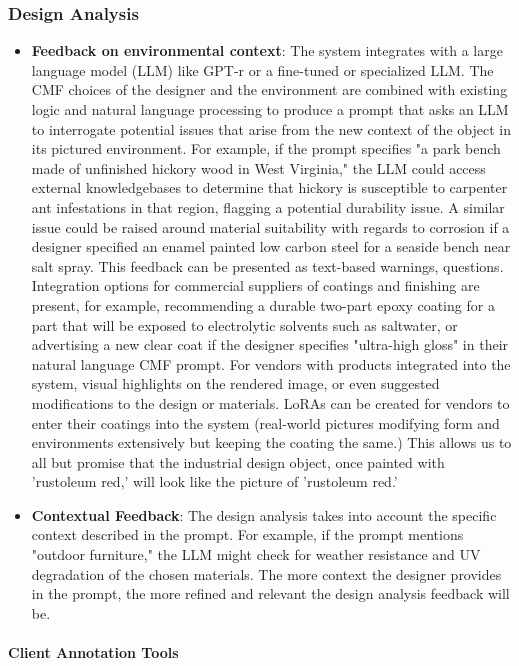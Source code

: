 \documentclass[12pt]{article}
\begin{document}
\subsubsection{Design Analysis}
\begin{itemize}
\item \textbf{Feedback on environmental context}: The system integrates with a large language model (LLM) like GPT-r or a fine-tuned or specialized LLM. The CMF choices of the designer and the environment are combined with existing logic and natural language processing to produce a prompt that asks an LLM to interrogate potential issues that arise from the new context of the object in its pictured environment. For example, if the prompt specifies "a park bench made of unfinished hickory wood in West Virginia," the LLM could access external knowledgebases to determine that hickory is susceptible to carpenter ant infestations in that region, flagging a potential durability issue. A similar issue could be raised around material suitability with regards to corrosion if a designer specified an enamel painted low carbon steel for a seaside bench near salt spray. This feedback can be presented as text-based warnings, questions. Integration options for commercial suppliers of coatings and finishing are present, for example, recommending a durable two-part epoxy coating for a part that will be exposed to electrolytic solvents such as saltwater, or advertising a new clear coat if the designer specifies "ultra-high gloss" in their natural language CMF prompt. For vendors with products integrated into the system, visual highlights on the rendered image, or even suggested modifications to the design or materials. LoRAs can be created for vendors to enter their coatings into the system (real-world pictures modifying form and environments extensively but keeping the coating the same.) This allows us to all but promise that the industrial design object, once painted with 'rustoleum red,' will look like the picture of 'rustoleum red.'

\item \textbf{Contextual Feedback}: The design analysis takes into account the specific context described in the prompt. For example, if the prompt mentions "outdoor furniture," the LLM might check for weather resistance and UV degradation of the chosen materials. The more context the designer provides in the prompt, the more refined and relevant the design analysis feedback will be.
\end{itemize}

\paragraph{Client Annotation Tools}
\end{document}
